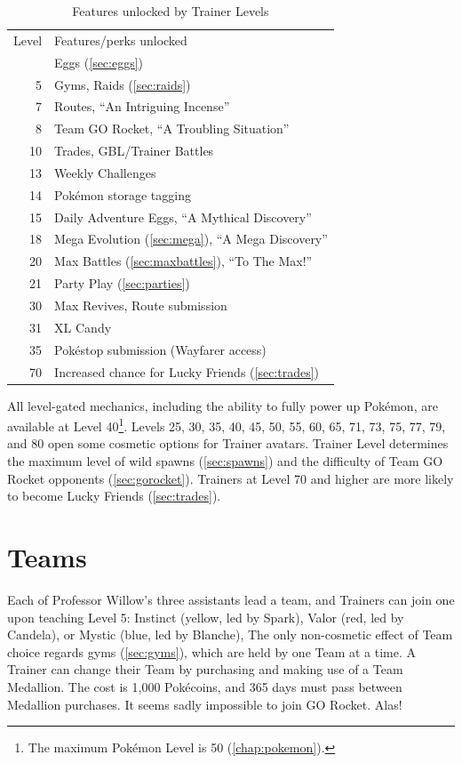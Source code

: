 \begin{table}
\centering\footnotesize
\begin{tabular}{rp{}}
Level & Features/perks unlocked \\
\Midrule
2 & Eggs (\autoref{sec:eggs})\\
5 & Gyms, Raids (\autoref{sec:raids})\\
7 & Routes, ``An Intriguing Incense''\\
8 & Team GO Rocket, ``A Troubling Situation'' \\
10 & Trades, GBL/Trainer Battles\\
13 & Weekly Challenges\\
14 & Pokémon storage tagging\\
15 & Daily Adventure Eggs, ``A Mythical Discovery'' \\
18 & Mega Evolution (\autoref{sec:mega}), ``A Mega Discovery''\\
20 & Max Battles (\autoref{sec:maxbattles}), ``To The Max!''\\
21 & Party Play (\autoref{sec:parties})\\
30 & Max Revives, Route submission\\
31 & XL Candy\\
35 & Pokéstop submission (Wayfarer access)\\
70 & Increased chance for Lucky Friends (\autoref{sec:trades})
\end{tabular}
\caption{Features unlocked by Trainer Levels\label{table:levelgates}}
\end{table}


All level-gated mechanics, including the ability to fully power up Pokémon,
 are available at Level 40\footnote{The maximum Pokémon Level is 50 (\autoref{chap:pokemon}).}.
Levels 25, 30, 35, 40, 45, 50, 55, 60, 65, 71, 73, 75, 77, 79, and 80 open some cosmetic options for Trainer avatars.
Trainer Level determines the maximum level of wild spawns
 (\autoref{sec:spawns}) and the difficulty of Team GO Rocket opponents
 (\autoref{sec:gorocket}).
Trainers at Level 70 and higher are more likely to become Lucky Friends (\autoref{sec:trades}).

\section{Teams}
Each of Professor Willow's three assistants lead a team, and Trainers can join one
 upon teaching Level 5: Instinct (yellow, led by Spark),
  Valor (red, led by Candela),
  or Mystic (blue, led by Blanche),
The only non-cosmetic effect of Team choice regards gyms (\autoref{sec:gyms}), which
  are held by one Team at a time.
A Trainer can change their Team by purchasing and making use of a Team Medallion.
The cost is 1,000 Pokécoins, and 365 days must pass between Medallion purchases.
It seems sadly impossible to join GO Rocket. Alas!

